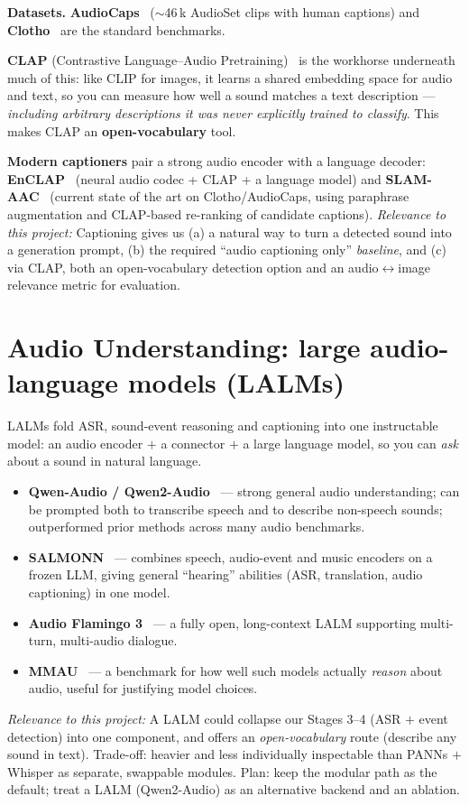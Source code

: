 \documentclass[11pt,a4paper]{article}
\newcommand{\rel}[1]{\smallskip\noindent\textit{Relevance to this project:} #1}
\begin{document}
\textbf{Datasets.} \textbf{AudioCaps}~\cite{audiocaps} ($\sim$46\,k AudioSet clips with human
captions) and \textbf{Clotho}~\cite{clotho} are the standard benchmarks.

\textbf{CLAP} (Contrastive Language--Audio Pretraining)~\cite{clap} is the workhorse underneath much of
this: like CLIP for images, it learns a shared embedding space for audio and text, so you can measure
how well a sound matches a text description --- \emph{including arbitrary descriptions it was never
explicitly trained to classify}. This makes CLAP an \textbf{open-vocabulary} tool.

\textbf{Modern captioners} pair a strong audio encoder with a language decoder:
\textbf{EnCLAP}~\cite{enclap} (neural audio codec + CLAP + a language model) and
\textbf{SLAM-AAC}~\cite{slamaac} (current state of the art on Clotho/AudioCaps, using paraphrase
augmentation and CLAP-based re-ranking of candidate captions).
\rel{Captioning gives us (a) a natural way to turn a detected sound into a generation prompt, (b) the
required ``audio captioning only'' \emph{baseline}, and (c) via CLAP, both an open-vocabulary
detection option and an audio$\leftrightarrow$image relevance metric for evaluation.}

\section{Audio Understanding: large audio-language models (LALMs)}
LALMs fold ASR, sound-event reasoning and captioning into one instructable model: an audio encoder
$+$ a connector $+$ a large language model, so you can \emph{ask} about a sound in natural language.
\begin{itemize}
  \item \textbf{Qwen-Audio / Qwen2-Audio}~\cite{qwenaudio} --- strong general audio understanding;
    can be prompted both to transcribe speech and to describe non-speech sounds; outperformed prior
    methods across many audio benchmarks.
  \item \textbf{SALMONN}~\cite{salmonn} --- combines speech, audio-event and music encoders on a
    frozen LLM, giving general ``hearing'' abilities (ASR, translation, audio captioning) in one
    model.
  \item \textbf{Audio Flamingo 3}~\cite{audioflamingo3} --- a fully open, long-context LALM supporting
    multi-turn, multi-audio dialogue.
  \item \textbf{MMAU}~\cite{mmau} --- a benchmark for how well such models actually \emph{reason}
    about audio, useful for justifying model choices.
\end{itemize}
\rel{A LALM could collapse our Stages 3--4 (ASR $+$ event detection) into one component, and offers an
\emph{open-vocabulary} route (describe any sound in text). Trade-off: heavier and less individually
inspectable than PANNs $+$ Whisper as separate, swappable modules. Plan: keep the modular path as the
default; treat a LALM (Qwen2-Audio) as an alternative backend and an ablation.}
\end{document}
